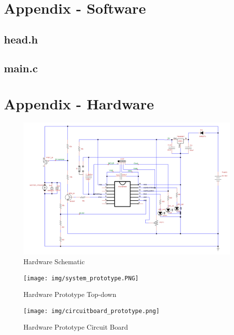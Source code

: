 \documentclass[a4paper]{article}
\begin{document}
\newpage
\pagestyle{empty}
\begin{landscape}

\section{Appendix - Software}
\subsection{head.h}

\newpage
\subsection{main.c}


\newpage
\section{Appendix - Hardware} \label{sect_hardware}

\begin{figure}[b!]
    \centering
    \includegraphics[width=1.3\textwidth]{img/hardware_schematic.PNG}
    \caption{Hardware Schematic}
    \label{fig:hardware_schematic}
\end{figure}

\begin{figure}[b!]
    \centering
    \texttt{[image: img/system\_prototype.PNG]}
    \caption{Hardware Prototype Top-down}
    \label{fig:system}
\end{figure}

\begin{figure}[b!]
    \centering
    \texttt{[image: img/circuitboard\_prototype.png]}
    \caption{Hardware Prototype Circuit Board}
    \label{fig:circuitboard}
\end{figure}

\end{landscape}
\end{document}
